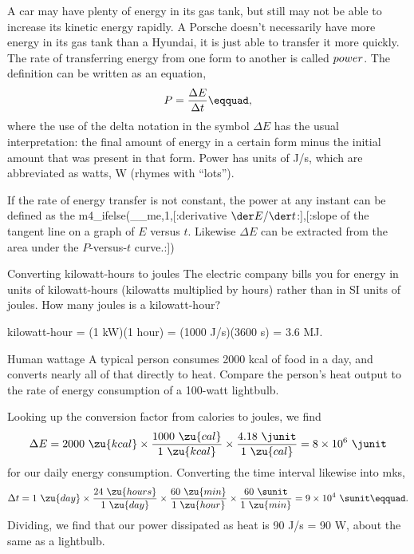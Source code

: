A car may have plenty of energy in its gas tank, but still
may not be able to increase its kinetic energy rapidly. A
Porsche doesn't necessarily have more energy in its gas tank
than a Hyundai, it is just able to transfer it more quickly.
The rate of transferring energy from one form to another is
called $\index{power}power$. The definition can be
written as an equation,
\begin{equation*}
                P    =     \frac{\Delta E}{\Delta t}\eqquad,
\end{equation*}
where the use of the delta notation in the symbol $\Delta E$
has the usual interpretation: the final amount of energy in a
certain form minus the initial amount that was present in
that form. Power has units of J/s, which are abbreviated as
watts, W (rhymes with ``lots'').

If the rate of energy transfer is not constant, the power at
any instant can be defined as the 
m4_ifelse(__me,1,[:derivative $\der E/\der t$:],[:slope of the tangent line
on a graph of $E$ versus $t$. Likewise $\Delta E$ can be
extracted from the area under the $P$-versus-$t$ curve.:])

\begin{eg}{Converting kilowatt-hours to joules}
\egquestion The electric company bills you for energy in units
of kilowatt-hours (kilowatts multiplied by hours) rather
than in SI units of joules. How many joules is a kilowatt-hour?

 kilowatt-hour = (1 kW)(1 hour) = (1000 J/s)(3600 s) = 3.6 MJ.
\end{eg}

\begin{eg}{Human wattage}
\egquestion A typical person consumes 2000 kcal of food in a
day, and converts nearly all of that directly to heat.
Compare the person's heat output to the rate of energy
consumption of a 100-watt lightbulb.

\eganswer Looking up the conversion factor from calories to joules, we find
\begin{equation*}
 \Delta E=2000\ \zu{kcal}\times\frac{1000\ \zu{cal}}{1\ \zu{kcal}}\times\frac{4.18\ \junit}{1\ \zu{cal}}=8\times10^6\ \junit
\end{equation*}
for our daily energy consumption. Converting the time
interval likewise into mks,
\begin{equation*}
 \Delta t=1\ \zu{day}\times\frac{24\ \zu{hours}}{1\ \zu{day}}\times\frac{60\ \zu{min}}{1\ \zu{hour}}\times\frac{60\ \sunit}{1\ \zu{min}}=9\times10^4\ \sunit\eqquad.
\end{equation*}
Dividing, we find that our power dissipated as heat is 90
J/s = 90 W, about the same as a lightbulb.
\end{eg}

